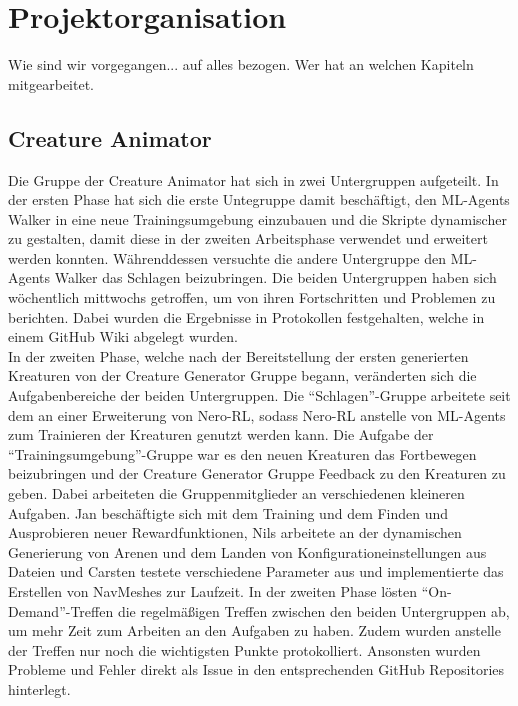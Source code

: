\section{Projektorganisation}

Wie sind wir vorgegangen... auf alles bezogen. Wer hat an welchen Kapiteln mitgearbeitet.

\subsection{Creature Animator}
Die Gruppe der Creature Animator hat sich in zwei Untergruppen aufgeteilt. In der ersten Phase hat sich die erste Untegruppe damit beschäftigt, den ML-Agents Walker in eine neue Trainingsumgebung einzubauen und die Skripte dynamischer zu gestalten, damit diese in der zweiten Arbeitsphase verwendet und erweitert werden konnten. Währenddessen versuchte die andere Untergruppe den ML-Agents Walker das Schlagen beizubringen. Die beiden Untergruppen haben sich wöchentlich mittwochs getroffen, um von ihren Fortschritten und Problemen zu berichten. Dabei wurden die Ergebnisse in Protokollen festgehalten, welche in einem GitHub Wiki abgelegt wurden.\\
In der zweiten Phase, welche nach der Bereitstellung der ersten generierten Kreaturen von der Creature Generator Gruppe begann, veränderten sich die Aufgabenbereiche der beiden Untergruppen. Die \enquote{Schlagen}-Gruppe arbeitete seit dem an einer Erweiterung von Nero-RL, sodass Nero-RL anstelle von ML-Agents zum Trainieren der Kreaturen genutzt werden kann. Die Aufgabe der \enquote{Trainingsumgebung}-Gruppe war es den neuen Kreaturen das Fortbewegen beizubringen und der Creature Generator Gruppe Feedback zu den Kreaturen zu geben. Dabei arbeiteten die Gruppenmitglieder an verschiedenen kleineren Aufgaben. Jan beschäftigte sich mit dem Training und dem Finden und Ausprobieren neuer Rewardfunktionen, Nils arbeitete an der dynamischen Generierung von Arenen und dem Landen von Konfigurationeinstellungen aus Dateien und Carsten testete verschiedene Parameter aus und implementierte das Erstellen von NavMeshes zur Laufzeit. In der zweiten Phase lösten \enquote{On-Demand}-Treffen die regelmäßigen Treffen zwischen den beiden Untergruppen ab, um mehr Zeit zum Arbeiten an den Aufgaben zu haben. Zudem wurden anstelle der Treffen nur noch die wichtigsten Punkte protokolliert. Ansonsten wurden Probleme und Fehler direkt als Issue in den entsprechenden GitHub Repositories hinterlegt.  
